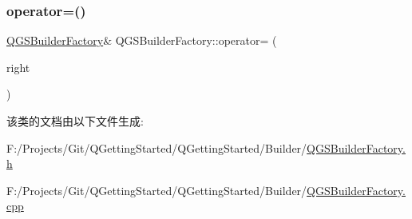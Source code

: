 \subsubsection{\texorpdfstring{operator=()}{operator=()}\hspace{0.1cm}{\footnotesize\ttfamily [2/2]}}
{\footnotesize\ttfamily \mbox{\hyperlink{class_q_g_s_builder_factory}{Q\+G\+S\+Builder\+Factory}}\& Q\+G\+S\+Builder\+Factory\+::operator= (\begin{DoxyParamCaption}\item[{\mbox{\hyperlink{class_q_g_s_builder_factory}{Q\+G\+S\+Builder\+Factory}} \&\&}]{right }\end{DoxyParamCaption})\hspace{0.3cm}{\ttfamily [delete]}}



该类的文档由以下文件生成\+:\begin{DoxyCompactItemize}
\item 
F\+:/\+Projects/\+Git/\+Q\+Getting\+Started/\+Q\+Getting\+Started/\+Builder/\mbox{\hyperlink{_q_g_s_builder_factory_8h}{Q\+G\+S\+Builder\+Factory.\+h}}\item 
F\+:/\+Projects/\+Git/\+Q\+Getting\+Started/\+Q\+Getting\+Started/\+Builder/\mbox{\hyperlink{_q_g_s_builder_factory_8cpp}{Q\+G\+S\+Builder\+Factory.\+cpp}}\end{DoxyCompactItemize}
